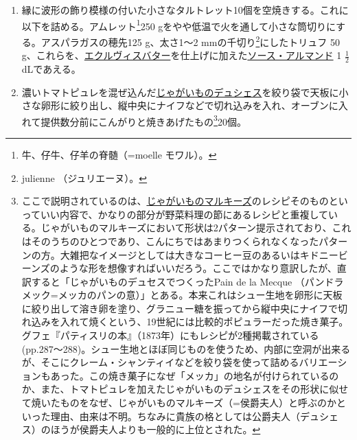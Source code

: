 \begin{recette}
\begin{enumerate}
\def\labelenumi{\arabic{enumi}.}
\item
  縁に波形の飾り模様の付いた小さなタルトレット10個を空焼きする。これに以下を詰める。アムレット\footnote{牛、仔牛、仔羊の脊髄（=moelle
    モワル）。}250
  gをやや低温で火を通して小さな筒切りにする。アスパラガスの穂先125
  g、太さ1〜2 mmの千切り\footnote{julienne （ジュリエーヌ）。}にしたトリュフ
  50
  g、これらを、\protect\hyperlink{beurre-d-ecrevisse}{エクルヴィスバター}を仕上げに加えた\protect\hyperlink{sauce-allemande}{ソース・アルマンド}
  1 \(\frac{1}{2}\) dLであえる。
\item
  濃いトマトピュレを混ぜ込んだ\protect\hyperlink{pommes-de-terre-duchesse}{じゃがいものデュシェス}を絞り袋で天板に小さな卵形に絞り出し、縦中央にナイフなどで切れ込みを入れ、オーブンに入れて提供数分前にこんがりと焼きあげたもの\footnote{ここで説明されているのは、\protect\hyperlink{pommes-de-terre-marquise}{じゃがいものマルキーズ}のレシピそのものといっていい内容で、かなりの部分が野菜料理の節にあるレシピと重複している。じゃがいものマルキーズにおいて形状は2パターン提示されており、これはそのうちのひとつであり、こんにちではあまりつくられなくなったパターンの方。大雑把なイメージとしては大きなコーヒー豆のあるいはキドニービーンズのような形を想像すればいいだろう。ここではかなり意訳したが、直訳すると「じゃがいものデュセスでつくったPain
    de la Mecque
    （パンドラメック=メッカのパンの意）」とある。本来これはシュー生地を卵形に天板に絞り出して溶き卵を塗り、グラニュー糖を振ってから縦中央にナイフで切れ込みを入れて焼くという、19世紀には比較的ポピュラーだった焼き菓子。グフェ『パティスリの本』（1873年）にもレシピが2種掲載されている
    (pp.287〜288)。シュー生地とほぼ同じものを使うため、内部に空洞が出来るが、そこにクレーム・シャンティイなどを絞り袋を使って詰めるバリエーションもあった。この焼き菓子になぜ「メッカ」の地名が付けられているのか、また、トマトピュレを加えたじゃがいものデュシェスをその形状に似せて焼いたものをなぜ、じゃがいものマルキーズ（=侯爵夫人）と呼ぶのかといった理由、由来は不明。ちなみに貴族の格としては公爵夫人（デュシェス）のほうが侯爵夫人よりも一般的に上位とされた。}20個。
\end{enumerate}

\atoaki{}

\hypertarget{garniture-marseillaise}{%
}
\end{recette}
